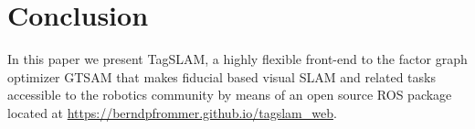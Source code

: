 \section{Conclusion}
In this paper we present TagSLAM, a highly flexible front-end to the
factor graph optimizer GTSAM that makes fiducial based visual SLAM and
related tasks accessible to the robotics community by means of an open
source ROS package located at
\url{https://berndpfrommer.github.io/tagslam_web}.
